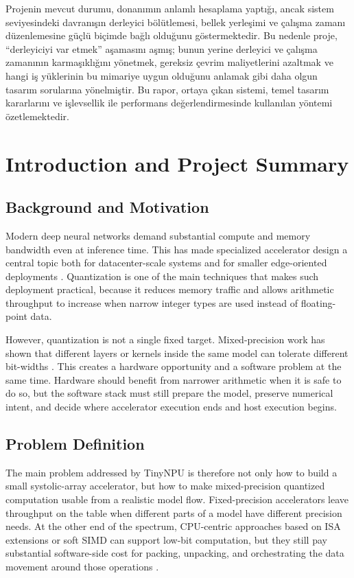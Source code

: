 \documentclass[a4paper, 12pt, titlepage]{article}
\begin{document}
Projenin mevcut durumu, donanımın anlamlı hesaplama yaptığı, ancak sistem seviyesindeki davranışın derleyici bölütlemesi, bellek yerleşimi ve çalışma zamanı düzenlemesine güçlü biçimde bağlı olduğunu göstermektedir. Bu nedenle proje, ``derleyiciyi var etmek'' aşamasını aşmış; bunun yerine derleyici ve çalışma zamanının karmaşıklığını yönetmek, gereksiz çevrim maliyetlerini azaltmak ve hangi iş yüklerinin bu mimariye uygun olduğunu anlamak gibi daha olgun tasarım sorularına yönelmiştir. Bu rapor, ortaya çıkan sistemi, temel tasarım kararlarını ve işlevsellik ile performans değerlendirmesinde kullanılan yöntemi özetlemektedir.

\newpage
\tableofcontents
\newpage

\section{Introduction and Project Summary}
\subsection{Background and Motivation}
Modern deep neural networks demand substantial compute and memory bandwidth even at inference time. This has made specialized accelerator design a central topic both for datacenter-scale systems and for smaller edge-oriented deployments \cite{jouppi2017datacenter, genc2021gemmini}. Quantization is one of the main techniques that makes such deployment practical, because it reduces memory traffic and allows arithmetic throughput to increase when narrow integer types are used instead of floating-point data.

However, quantization is not a single fixed target. Mixed-precision work has shown that different layers or kernels inside the same model can tolerate different bit-widths \cite{wu2018mixedprecision}. This creates a hardware opportunity and a software problem at the same time. Hardware should benefit from narrower arithmetic when it is safe to do so, but the software stack must still prepare the model, preserve numerical intent, and decide where accelerator execution ends and host execution begins.

\subsection{Problem Definition}
The main problem addressed by TinyNPU is therefore not only how to build a small systolic-array accelerator, but how to make mixed-precision quantized computation usable from a realistic model flow. Fixed-precision accelerators leave throughput on the table when different parts of a model have different precision needs. At the other end of the spectrum, CPU-centric approaches based on ISA extensions or soft SIMD can support low-bit computation, but they still pay substantial software-side cost for packing, unpacking, and orchestrating the data movement around those operations \cite{garofalo2021xpulpnn, armeniakos2024mixedprecision, fornt2025mixgemm}.
\end{document}
